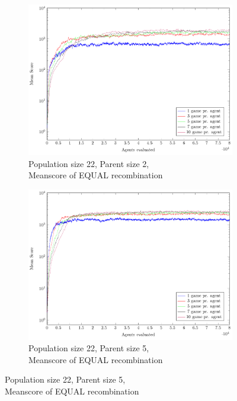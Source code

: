 \begin{figure}
    \centering
    \begin{subfigure}[b]{0.45\textwidth}
    	\centering
        \caption{Population size 22, Parent size 2, \\Meanscore of EQUAL recombination}
        \includegraphics[width=\textwidth]{data/cma_population_offspring/22x_split/equal_l22_o2/mean/PlotFile.pdf}
    \end{subfigure} 
    \begin{subfigure}[b]{0.45\textwidth}
    	\centering
    	\caption{Population size 22, Parent size 5, \\ Meanscore of EQUAL recombination}
        \includegraphics[width=\textwidth]{data/cma_population_offspring/22x_split/equal_l22_o5/mean/PlotFile.pdf}

\end{subfigure}
\end{figure}
